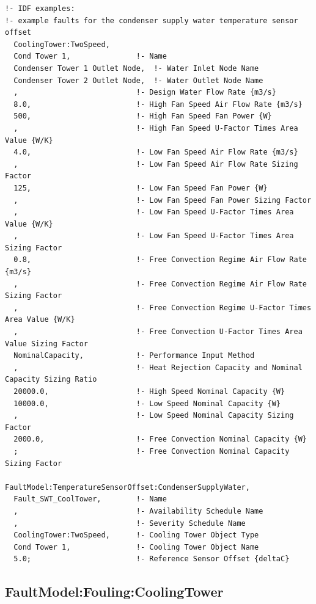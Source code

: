 \begin{lstlisting}
!- IDF examples:
!- example faults for the condenser supply water temperature sensor offset
  CoolingTower:TwoSpeed,
  Cond Tower 1,               !- Name
  Condenser Tower 1 Outlet Node,  !- Water Inlet Node Name
  Condenser Tower 2 Outlet Node,  !- Water Outlet Node Name
  ,                           !- Design Water Flow Rate {m3/s}
  8.0,                        !- High Fan Speed Air Flow Rate {m3/s}
  500,                        !- High Fan Speed Fan Power {W}
  ,                           !- High Fan Speed U-Factor Times Area Value {W/K}
  4.0,                        !- Low Fan Speed Air Flow Rate {m3/s}
  ,                           !- Low Fan Speed Air Flow Rate Sizing Factor
  125,                        !- Low Fan Speed Fan Power {W}
  ,                           !- Low Fan Speed Fan Power Sizing Factor
  ,                           !- Low Fan Speed U-Factor Times Area Value {W/K}
  ,                           !- Low Fan Speed U-Factor Times Area Sizing Factor
  0.8,                        !- Free Convection Regime Air Flow Rate {m3/s}
  ,                           !- Free Convection Regime Air Flow Rate Sizing Factor
  ,                           !- Free Convection Regime U-Factor Times Area Value {W/K}
  ,                           !- Free Convection U-Factor Times Area Value Sizing Factor
  NominalCapacity,            !- Performance Input Method
  ,                           !- Heat Rejection Capacity and Nominal Capacity Sizing Ratio
  20000.0,                    !- High Speed Nominal Capacity {W}
  10000.0,                    !- Low Speed Nominal Capacity {W}
  ,                           !- Low Speed Nominal Capacity Sizing Factor
  2000.0,                     !- Free Convection Nominal Capacity {W}
  ;                           !- Free Convection Nominal Capacity Sizing Factor

FaultModel:TemperatureSensorOffset:CondenserSupplyWater,
  Fault_SWT_CoolTower,        !- Name
  ,                           !- Availability Schedule Name
  ,                           !- Severity Schedule Name
  CoolingTower:TwoSpeed,      !- Cooling Tower Object Type
  Cond Tower 1,               !- Cooling Tower Object Name
  5.0;                        !- Reference Sensor Offset {deltaC}
\end{lstlisting}


\subsection{FaultModel:Fouling:CoolingTower}\label{faultmodelfoulingcoolingtower}

